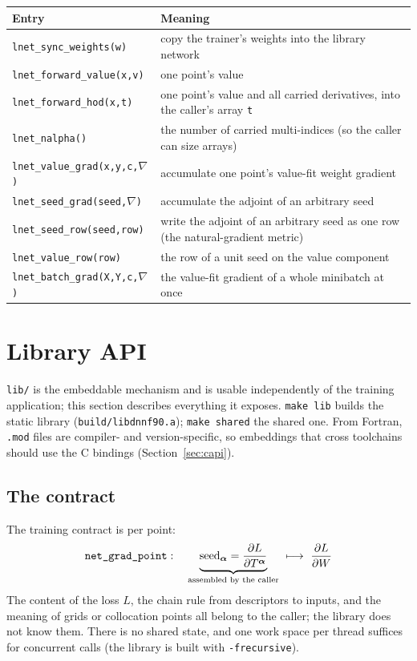 \documentclass[10pt,a4paper]{article}
\newcommand{\code}[1]{\texttt{#1}}
\newcommand{\mi}[1]{\boldsymbol{#1}}
\begin{document}
\begin{longtable}{@{}p{}p{}@{}}
\toprule
Entry & Meaning \\
\midrule
\endhead
\code{lnet\_sync\_weights(w)} & copy the trainer's weights into the library network\\
\code{lnet\_forward\_value(x,v)} & one point's value\\
\code{lnet\_forward\_hod(x,t)} & one point's value and all carried derivatives, into the caller's array \code{t}\\
\code{lnet\_nalpha()} & the number of carried multi-indices (so the caller can size arrays)\\
\code{lnet\_value\_grad(x,y,c,$\nabla$)} & accumulate one point's value-fit weight gradient\\
\code{lnet\_seed\_grad(seed,$\nabla$)} & accumulate the adjoint of an arbitrary seed\\
\code{lnet\_seed\_row(seed,row)} & write the adjoint of an arbitrary seed as one row (the natural-gradient metric)\\
\code{lnet\_value\_row(row)} & the row of a unit seed on the value component\\
\code{lnet\_batch\_grad(X,Y,c,$\nabla$)} & the value-fit gradient of a whole minibatch at once\\
\bottomrule
\end{longtable}

\section{Library API}
\label{sec:libapi}

\code{lib/} is the embeddable mechanism and is usable independently of
the training application; this section describes everything it
exposes. \code{make lib} builds the static library
(\code{build/libdnnf90.a}); \code{make shared} the shared one. From
Fortran, \code{.mod} files are compiler- and version-specific, so
embeddings that cross toolchains should use the C bindings
(Section~\ref{sec:capi}).

\subsection{The contract}

The training contract is per point:
\[
\text{\code{net\_grad\_point}}:\quad
\underbrace{\text{seed}_{\mi\alpha}=\frac{\partial L}{\partial T^{\mi\alpha}}}_{\text{assembled by the caller}}
\ \longmapsto\
\frac{\partial L}{\partial W}
\]
The content of the loss $L$, the chain rule from descriptors to
inputs, and the meaning of grids or collocation points all belong to
the caller; the library does not know them. There is no shared state,
and one work space per thread suffices for concurrent calls (the
library is built with \code{-frecursive}).
\end{document}
